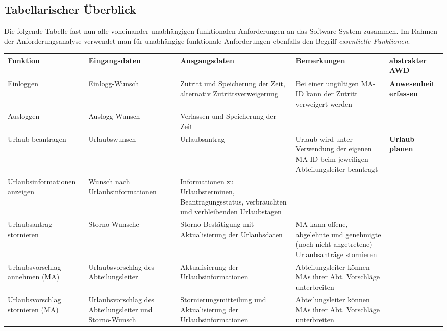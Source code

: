 \subsection{Tabellarischer \"Uberblick}
Die folgende Tabelle fast nun alle voneinander unabh\"angigen funktionalen Anforderungen an das Software-System zusammen.  Im Rahmen der Anforderungsanalyse verwendet man f\"ur unabh\"angige funktionale Anforderungen ebenfalls den Begriff  \textit{essentielle Funktionen}.

\vspace{0,5cm}
\hspace{-3,5cm}
{
\footnotesize
\begin{tabular}{|p{3cm}|p{4cm}|p{4cm}|p{4cm}|p{2cm}|}
	\hline
		\textbf{Funktion	} &	
		\textbf{Eingangsdaten} &
		\textbf{Ausgangsdaten}& 
		\textbf{Bemerkungen}	&
		\textbf{abstrakter AWD} \\
	\hline \hline 
		Einloggen &
		Einlogg-Wunsch &
		Zutritt und Speicherung der Zeit, alternativ Zutrittsverweigerung & 
		Bei einer ung\"ultigen MA-ID kann der Zutritt verweigert werden &  
		\textbf{Anwesenheit erfassen} \\
	\cline{1-4}
		Ausloggen & 
		Auslogg-Wunsch & 
		Verlassen und Speicherung der Zeit &
		&  
		\\
	\hline
		Urlaub beantragen & 
		Urlaubswunsch & 
		Urlaubsantrag & 
		Urlaub wird unter Verwendung der eigenen MA-ID beim jeweiligen Abteilungsleiter beantragt & 
		\textbf{Urlaub  \newline planen} \\
	\cline{1-4}
		Urlaubsinformationen anzeigen & 
		Wunsch nach Urlaubsinformationen & 
		Informationen zu Urlaubsterminen, Beantragungsstatus, verbrauchten und verbleibenden Urlaubstagen &  
		&  
		\\
	\cline{1-4}
		Urlaubsantrag stornieren &
		Storno-Wunsche &
		Storno-Best\"atigung mit Aktualisierung der Urlaubsdaten &
		MA kann offene, abgelehnte und genehmigte (noch nicht angetretene) Urlaubsantr\"age stornieren &
		\\
	\cline{1-4}
		Urlaubsvorschlag annehmen (MA) &
		Urlaubsvorschlag des Abteilungsleiter &
		 Aktualisierung der Urlaubsinformationen &
		Abteilungsleiter k\"onnen MAs ihrer Abt. Vorschl\"age unterbreiten &
		\\
	\cline{1-4}
		Urlaubsvorschlag stornieren (MA) &
		Urlaubsvorschlag des Abteilungsleiter und Storno-Wunsch &
		Stornierungsmitteilung und Aktualisierung der Urlaubsinformationen &
		Abteilungsleiter k\"onnen MAs ihrer Abt. Vorschl\"age unterbreiten &

\end{tabular}}
